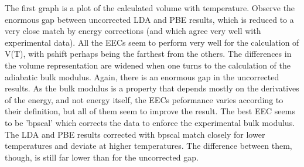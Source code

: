 \documentclass[a4paper]{article}
\begin{document}
\noindent{}

\noindent{}

The first graph is a plot of the calculated volume with
temperature. Observe the enormous gap between uncorrected LDA and PBE
results, which is reduced to a very close match by energy
corrections (and which agree very well with experimental data). All
the EECs seem to perform very well for the calculation of V(T), with
pshift perhaps being the farthest from the others. The differences in
the volume representation are widened when one turns to the
calculation of the adiabatic bulk modulus. Again, there is an enormous
gap in the uncorrected results. As the bulk modulus is a property that
depends mostly on the derivatives of the energy, and not energy
itself, the EECs peformance varies according to their definition, but
all of them seem to improve the result. The best EEC seems to be
'bpscal' which corrects the data to enforce the experimental bulk
modulus. The LDA and PBE results corrected with bpscal match closely
for lower temperatures and deviate at higher temperatures. The
difference between them, though, is still far lower than for the
uncorrected gap.
\end{document}
